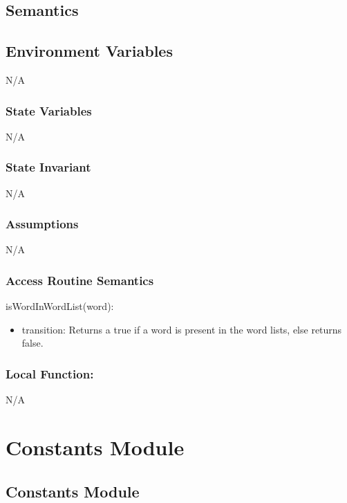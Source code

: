 \documentclass[12pt]{article}
\begin{document}
\subsection* {Semantics}

\subsection*{Environment Variables}

N/A

\subsubsection* {State Variables}
N/A

\subsubsection* {State Invariant}

N/A

\subsubsection* {Assumptions}

N/A

\subsubsection* {Access Routine Semantics}

\noindent isWordInWordList(word):
\begin{itemize}
  \item transition: Returns a true if a word is present in the word lists, else returns false.
\end{itemize}

\subsubsection*{Local Function:}

N/A

\newpage

\section {Constants Module}

\subsection* {Constants Module}
\end{document}
